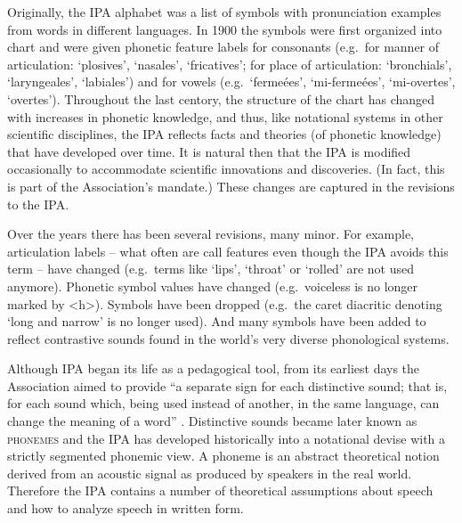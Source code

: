 Originally, the IPA alphabet was a list of symbols with pronunciation examples
from words in different languages. In 1900 the symbols were first organized into
chart and were given phonetic feature labels for consonants (e.g.\ for manner of
articulation: `plosives', `nasales', `fricatives'; for place of articulation:
`bronchials', `laryngeales', `labiales') and for vowels (e.g.\ `fermeées',
`mi-fermeées', `mi-overtes', `overtes'). Throughout the last centory, the
structure of the chart has changed with increases in phonetic knowledge, and
thus, like notational systems in other scientific disciplines, the IPA reflects
facts and theories (of phonetic knowledge) that have developed over time. It is
natural then that the IPA is modified occasionally to accommodate scientific
innovations and discoveries. (In fact, this is part of the Association's
mandate.) These changes are captured in the revisions to the IPA.

Over the years there has been several revisions, many minor. For example,
articulation labels -- what often are call features even though the IPA avoids
this term -- have changed (e.g.\ terms like `lips', `throat' or `rolled' are not
used anymore). Phonetic symbol values have changed (e.g.\ voiceless is no longer
marked by <h>). Symbols have been dropped (e.g.\ the caret diacritic denoting
`long and narrow' is no longer used). And many symbols have been added to reflect
contrastive sounds found in the world's very diverse phonological systems.

Although IPA began its life as a pedagogical tool, from its earliest days the 
Association aimed to provide ``a separate sign for each distinctive sound; 
that is, for each sound which, being used instead of another, in the same 
language, can change the meaning of a word'' \citep[27]{IPA1999}. Distinctive 
sounds became later known as \textsc{phonemes} and the IPA has developed historically 
into a notational devise with a strictly segmented phonemic view. A phoneme is an 
abstract theoretical notion derived from an acoustic signal as produced by speakers 
in the real world. Therefore the IPA contains a number of theoretical assumptions 
about speech and how to analyze speech in written form. 

